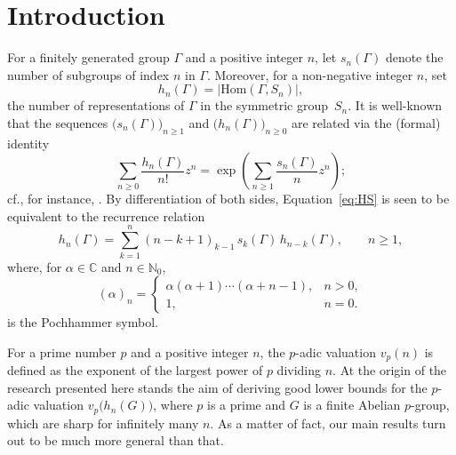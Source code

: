 \documentclass[12pt,reqno]{amsart}
\numberwithin{equation}{section}
\theoremstyle{remark}
\begin{document}
\maketitle

\section{Introduction}

\noindent For a finitely generated group $\Gamma$ and a positive integer $n$,
let $s_n(\Gamma)$ denote the number of subgroups of index $n$ in
$\Gamma$. Moreover, for a non-negative integer $n$, set  
\[
h_n(\Gamma)= 
\vert\mathrm{Hom}(\Gamma, S_n)\vert,
\]
the number of representations of $\Gamma$ in the symmetric group~$S_n$.
It is well-known that the sequences $\big(s_n(\Gamma)\big)_{n\geq1}$ and
$\big(h_n(\Gamma)\big)_{n\geq0}$ are related via the (formal) identity 
\begin{equation} 
\label{eq:HS}
\sum_{n\ge0} \frac {h_n(\Gamma)} {n!} z^n = \exp\left(
\sum_{n\ge1} \frac {s_n(\Gamma)} {n} z^n\right); 
\end{equation}
cf., for instance, \cite[Prop.~1]{DM}. By differentiation of both sides, 
Equation~\eqref{eq:HS} is seen to be equivalent to the recurrence relation
\begin{equation}
\label{Eq:HallTransform}
h_n(\Gamma) = \sum_{k=1}^n ( n-k+1)_{k-1}\, s_k(\Gamma)\,
h_{n-k}(\Gamma),\quad \quad n\geq1, 
\end{equation}
where, for
$\alpha\in\mathbb{C}$ and $n\in\mathbb{N}_0$,  
\[
(\alpha)_n = \begin{cases}
\alpha(\alpha+1)\cdots(\alpha+n-1),& n>0,\\
1,& n=0.\end{cases}
\]
is the Pochhammer symbol. 

For a prime number $p$ and a
  positive integer $n$, the $p$-adic valuation $v_p(n)$ is defined as the
  exponent of the largest power of $p$ dividing $n$.
At the origin of the research presented here stands
the aim of deriving good lower
bounds for the $p$-adic valuation 
$v_p\big(h_n(G)\big)$, where $p$ is a prime and $G$ is a finite Abelian
$p$-group, which are sharp for infinitely many $n$. As a matter of fact,
our main results turn out to be much more general than that.  
\end{document}
